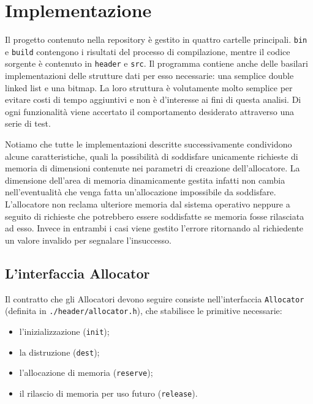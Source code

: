 \chapter{Implementazione}

Il progetto contenuto nella repository è gestito in quattro cartelle principali. \texttt{bin} e \texttt{build} contengono i risultati del processo di compilazione, mentre il codice sorgente è contenuto in \texttt{header} e \texttt{src}. Il programma contiene anche delle basilari implementazioni delle strutture dati per esso necessarie: una semplice double linked list e una bitmap. La loro struttura è volutamente molto semplice per evitare costi di tempo aggiuntivi e non è d’interesse ai fini di questa analisi. Di ogni funzionalità viene accertato il comportamento desiderato attraverso una serie di test.

Notiamo che tutte le implementazioni descritte successivamente condividono alcune caratteristiche, quali la possibilità di soddisfare unicamente richieste di memoria di dimensioni contenute nei parametri di creazione dell’allocatore. La dimensione dell’area di memoria dinamicamente gestita infatti non cambia nell’eventualità che venga fatta un’allocazione impossibile da soddisfare. L’allocatore non reclama ulteriore memoria dal sistema operativo neppure a seguito di richieste che potrebbero essere soddisfatte se memoria fosse rilasciata ad esso. Invece in entrambi i casi viene gestito l’errore ritornando al richiedente un valore invalido per segnalare l’insuccesso.

\section{L’interfaccia Allocator}

Il contratto che gli Allocatori devono seguire consiste nell’interfaccia \texttt{Allocator} (definita in \texttt{./header/allocator.h}), che stabilisce le primitive necessarie:
\begin{itemize}
  \item l’inizializzazione (\texttt{init});
  \item la distruzione (\texttt{dest});
  \item l’allocazione di memoria (\texttt{reserve});
  \item il rilascio di memoria per uso futuro (\texttt{release}).
\end{itemize}


